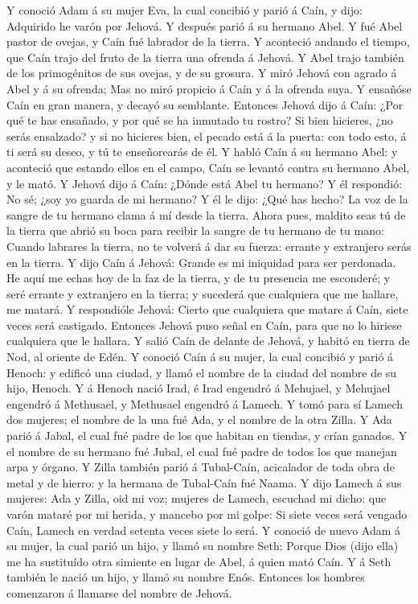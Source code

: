  Y conoció Adam á su mujer Eva, la cual concibió y parió á
Caín, y dijo: Adquirido he varón por Jehová.  Y después
parió á su hermano Abel. Y fué Abel pastor de ovejas, y Caín fué
labrador de la tierra.  Y aconteció andando el tiempo, que
Caín trajo del fruto de la tierra una ofrenda á Jehová.  Y
Abel trajo también de los primogénitos de sus ovejas, y de su grosura. Y
miró Jehová con agrado á Abel y á su ofrenda;  Mas no miró
propicio á Caín y á la ofrenda suya. Y ensañóse Caín en gran manera, y
decayó su semblante.  Entonces Jehová dijo á Caín: ¿Por qué
te has ensañado, y por qué se ha inmutado tu rostro?  Si
bien hicieres, ¿no serás ensalzado? y si no hicieres bien, el pecado
está á la puerta: con todo esto, á ti será su deseo, y tú te
enseñorearás de él.  Y habló Caín á su hermano Abel: y
aconteció que estando ellos en el campo, Caín se levantó contra su
hermano Abel, y le mató.  Y Jehová dijo á Caín: ¿Dónde está
Abel tu hermano? Y él respondió: No sé; ¿soy yo guarda de mi hermano?
 Y él le dijo: ¿Qué has hecho? La voz de la sangre de tu
hermano clama á mí desde la tierra.  Ahora pues, maldito
seas tú de la tierra que abrió su boca para recibir la sangre de tu
hermano de tu mano:  Cuando labrares la tierra, no te
volverá á dar su fuerza: errante y extranjero serás en la tierra.
 Y dijo Caín á Jehová: Grande es mi iniquidad para ser
perdonada.  He aquí me echas hoy de la faz de la tierra, y
de tu presencia me esconderé; y seré errante y extranjero en la tierra;
y sucederá que cualquiera que me hallare, me matará.  Y
respondióle Jehová: Cierto que cualquiera que matare á Caín, siete veces
será castigado. Entonces Jehová puso señal en Caín, para que no lo
hiriese cualquiera que le hallara.  Y salió Caín de delante
de Jehová, y habitó en tierra de Nod, al oriente de Edén. 
Y conoció Caín á su mujer, la cual concibió y parió á Henoch: y edificó
una ciudad, y llamó el nombre de la ciudad del nombre de su hijo,
Henoch.  Y á Henoch nació Irad, é Irad engendró á Mehujael,
y Mehujael engendró á Methusael, y Methusael engendró á Lamech.
 Y tomó para sí Lamech dos mujeres; el nombre de la una fué
Ada, y el nombre de la otra Zilla.  Y Ada parió á Jabal, el
cual fué padre de los que habitan en tiendas, y crían ganados.
 Y el nombre de su hermano fué Jubal, el cual fué padre de
todos los que manejan arpa y órgano.  Y Zilla también parió
á Tubal-Caín, acicalador de toda obra de metal y de hierro: y la hermana
de Tubal-Caín fué Naama.  Y dijo Lamech á sus mujeres: Ada
y Zilla, oid mi voz; mujeres de Lamech, escuchad mi dicho: que varón
mataré por mi herida, y mancebo por mi golpe:  Si siete
veces será vengado Caín, Lamech en verdad setenta veces siete lo será.
 Y conoció de nuevo Adam á su mujer, la cual parió un hijo,
y llamó su nombre Seth: Porque Dios (dijo ella) me ha sustituído otra
simiente en lugar de Abel, á quien mató Caín.  Y á Seth
también le nació un hijo, y llamó su nombre Enós. Entonces los hombres
comenzaron á llamarse del nombre de Jehová.

